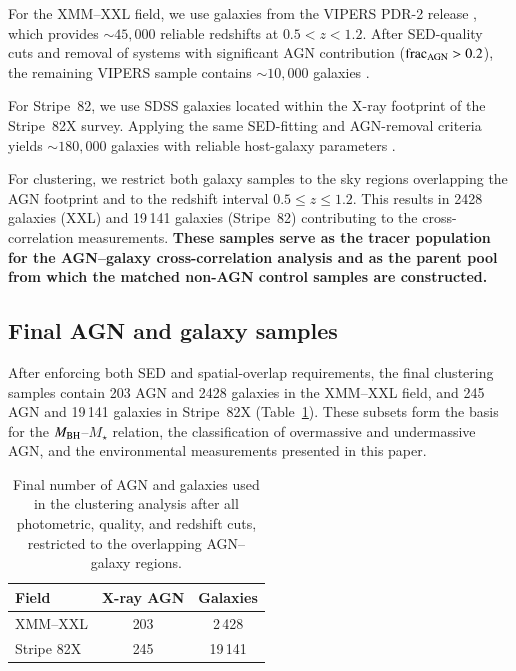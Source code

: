 \documentclass{aa}
\begin{document}
For the XMM--XXL field, we use galaxies from the VIPERS PDR-2 release \citep{Garilli2014, Scodeggio2018}, which provides $\sim45{,}000$ reliable redshifts at $0.5<z<1.2$.  
After SED-quality cuts and removal of systems with significant AGN contribution (${\rm frac_{AGN}} > 0.2$), the remaining VIPERS sample contains $\sim 10{,}000$ galaxies \citep{Mountrichas2023d}.  

For Stripe~82, we use SDSS galaxies located within the X-ray footprint of the Stripe~82X survey.  
Applying the same SED-fitting and AGN-removal criteria yields $\sim 180{,}000$ galaxies with reliable host-galaxy parameters \citep[][]{Mountrichas2025a}.

For clustering, we restrict both galaxy samples to the sky regions overlapping the AGN footprint and to the redshift interval $0.5 \leq z \leq 1.2$.  
This results in 2428 galaxies (XXL) and 19\,141 galaxies (Stripe~82) contributing to the cross-correlation measurements. \textbf{These samples serve as the tracer population for the AGN--galaxy cross-correlation analysis and as the parent pool from which the matched non-AGN control samples are constructed.}

\subsection{Final AGN and galaxy samples}
\label{sec_final}

After enforcing both SED and spatial-overlap requirements, the final clustering samples contain 203 AGN and 2428 galaxies in the XMM--XXL field, and 245 AGN and 19\,141 galaxies in Stripe~82X (Table~\ref{table_numbers}).  
These subsets form the basis for the $M_{\rm BH}$--$M_\star$ relation, the classification of overmassive and undermassive AGN, and the environmental measurements presented in this paper.

\begin{table}[ht]
\centering
\caption{Final number of AGN and galaxies used in the clustering analysis after all photometric, quality, and redshift cuts, restricted to the overlapping AGN--galaxy regions.}
\label{table_numbers}
\begin{tabular}{lcc}
\hline\hline
Field & X-ray AGN & Galaxies \\
\hline
XMM--XXL      & 203 & 2\,428 \\
Stripe 82X    & 245 & 19\,141 \\
\hline
\end{tabular}
\end{table}
\end{document}
